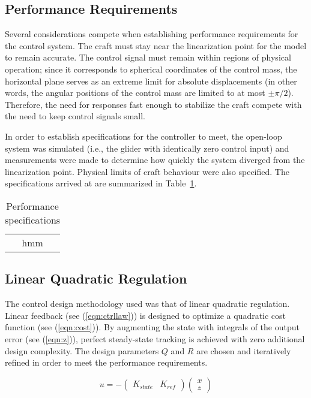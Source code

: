 \documentclass{sydeStyle}
\begin{document}
\subsection{Performance Requirements}
Several considerations compete when establishing performance requirements for
the control system.  The craft must stay near the linearization point for the
model to remain accurate.  The control signal must remain within regions of
physical operation; since it corresponds to spherical coordinates of the control
mass, the horizontal plane serves as an extreme limit for absolute displacements
(in other words, the angular positions of the control mass are limited to at
most $\pm \pi/2$).  Therefore, the need for responses fast enough to stabilize
the craft compete with the need to keep control signals small.

In order to establish specifications for the controller to meet, the open-loop
system was simulated (i.e., the glider with identically zero control input) and
measurements were made to determine how quickly the system diverged from the
linearization point.  Physical limits of craft behaviour were also specified.
The specifications arrived at are summarized in Table~\ref{tab:specs}.

\begin{table}[b]
    \centering
    \begin{tabular}{|c|}
        hmm
    \end{tabular}
    \caption{Performance specifications}
    \label{tab:specs}
\end{table}

\subsection{Linear Quadratic Regulation}
The control design methodology used was that of linear quadratic regulation.
Linear feedback (see (\ref{eqn:ctrllaw})) is designed to optimize a quadratic
cost function (see (\ref{eqn:cost})).  By augmenting the state with
integrals of the output error (see (\ref{eqn:z})), perfect steady-state tracking
is achieved with zero additional design complexity.  The design parameters $Q$
and $R$ are chosen and iteratively refined in order to meet the performance
requirements.

\begin{equation}
    u
    =
    -
    \begin{pmatrix}
        K_{state} & K_{ref}
    \end{pmatrix}
    \begin{pmatrix}
        x \\ z
    \end{pmatrix}
    \label{eqn:ctrllaw}
\end{equation}
\end{document}
